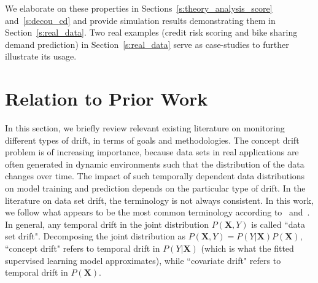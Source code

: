 \documentclass[twoside,11pt]{article}
\begin{document}



We elaborate on these properties in Sections~\ref{s:theory_analysis_score} and~\ref{s:decou_cd} and provide simulation results demonstrating them in Section~\ref{s:real_data}. Two real examples (credit risk scoring and bike sharing demand prediction) in Section~\ref{s:real_data} serve as case-studies to further illustrate its usage.

\section{Relation to Prior Work}
In this section, we briefly review relevant existing literature on monitoring different types of drift, in terms of goals and methodologies. The concept drift problem is of increasing importance, because data sets in real applications are often generated in dynamic environments such that the distribution of the data changes over time. The impact of such temporally dependent data distributions on model training and prediction depends on the particular type of drift. In the literature on data set drift, the terminology is not always consistent. In this work, we follow what appears to be the most common terminology according to~\cite{moreno2012unifying} and~\cite{vzliobaite2016overview}. In general, any temporal drift in the joint distribution $P(\bm {X}, Y)$ is called ``data set drift". Decomposing the joint distribution as $P(\bm{X}, Y) = P(Y|\bm{X})P(\bm {X})$, ``concept drift" refers to temporal drift in $P(Y|\bm{X})$ (which is what the fitted supervised learning model approximates), while ``covariate drift" refers to temporal drift in $P(\bm{X})$.
\end{document}

